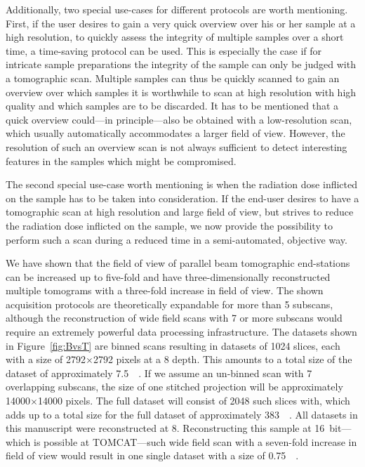 Additionally, two special use-cases for different protocols are worth mentioning. First, if the user desires to gain a very quick overview over his or her sample at a high resolution, \eg to quickly assess the integrity of multiple samples over a short time, a time-saving protocol can be used. This is especially the case if for intricate sample preparations the integrity of the sample can only be judged with a tomographic scan. Multiple samples can thus be quickly scanned to gain an overview over which samples it is worthwhile to scan at high resolution with high quality and which samples are to be discarded. It has to be mentioned that a quick overview could---in principle---also be obtained with a low-resolution scan, which usually automatically accommodates a larger field of view. However, the resolution of such an overview scan is not always sufficient to detect interesting features in the samples which might be compromised.

The second special use-case worth mentioning is when the radiation dose inflicted on the sample has to be taken into consideration. If the end-user desires to have a tomographic scan at high resolution and large field of view, but strives to reduce the radiation dose inflicted on the sample, we now provide the possibility to perform such a scan during a reduced time in a semi-automated, objective way.

We have shown that the field of view of parallel beam tomographic end-stations can be increased up to five-fold and have three-dimensionally reconstructed multiple tomograms with a three-fold increase in field of view. The shown acquisition protocols are theoretically expandable for more than 5 subscans, although the reconstruction of wide field scans with 7 or more subscans would require an extremely powerful data processing infrastructure. The datasets shown in Figure~\ref{fig:BvsT} are binned scans resulting in datasets of 1024 slices, each with a size of 2792$\times$2792 pixels at a \SI{8}{\bit} depth. This amounts to a total size of the dataset of approximately \SI{7.5}{\giga\byte}. If we assume an un-binned scan with 7 overlapping subscans, the size of one stitched projection will be approximately 14000$\times$14000 pixels. The full dataset will consist of 2048 such slices with, which adds up to a total size for the full dataset of approximately \SI{383}{\giga\byte}. All datasets in this manuscript were reconstructed at \SI{8}{\bit}. Reconstructing this sample at \SI{16}{bit}---which is possible at TOMCAT---such wide field scan with a seven-fold increase in field of view would result in one single dataset with a size of \SI{0.75}{\tera\byte}.

